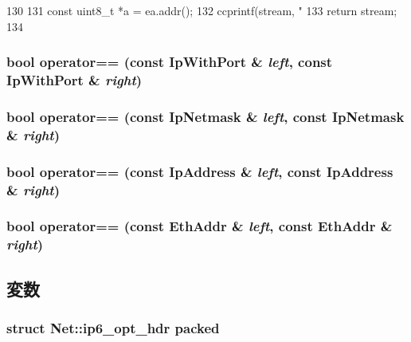 \begin{DoxyCode}
130 {
131     const uint8_t *a = ea.addr();
132     ccprintf(stream, "%
133     return stream;
134 }
\end{DoxyCode}
\hypertarget{namespaceNet_a5ae44ae1ca684e220c0c9faaa1c5ad8e}{
\subsubsection[{operator==}]{\setlength{\rightskip}{0pt plus 5cm}bool operator== (const IpWithPort \& {\em left}, \/  const IpWithPort \& {\em right})}}
\label{namespaceNet_a5ae44ae1ca684e220c0c9faaa1c5ad8e}
\hypertarget{namespaceNet_a357f3a34efde4268307952994cc42425}{
\subsubsection[{operator==}]{\setlength{\rightskip}{0pt plus 5cm}bool operator== (const IpNetmask \& {\em left}, \/  const IpNetmask \& {\em right})}}
\label{namespaceNet_a357f3a34efde4268307952994cc42425}
\hypertarget{namespaceNet_a810805db3cea409a0911b6c62204e387}{
\subsubsection[{operator==}]{\setlength{\rightskip}{0pt plus 5cm}bool operator== (const IpAddress \& {\em left}, \/  const IpAddress \& {\em right})}}
\label{namespaceNet_a810805db3cea409a0911b6c62204e387}
\hypertarget{namespaceNet_a1f08134ae5bedef31ccc578238491634}{
\subsubsection[{operator==}]{\setlength{\rightskip}{0pt plus 5cm}bool operator== (const EthAddr \& {\em left}, \/  const EthAddr \& {\em right})}}
\label{namespaceNet_a1f08134ae5bedef31ccc578238491634}


\subsection{変数}
\hypertarget{namespaceNet_a4bfa83470dbd48cb568b3c42fdf1e48d}{
\subsubsection[{packed}]{\setlength{\rightskip}{0pt plus 5cm}struct {\bf Net::ip6\_\-opt\_\-hdr} {\bf packed}}}
\label{namespaceNet_a4bfa83470dbd48cb568b3c42fdf1e48d}
